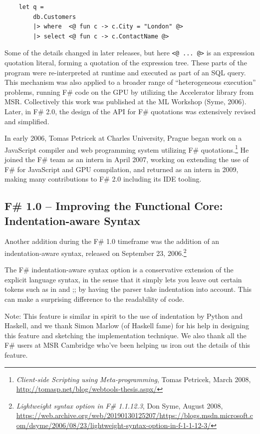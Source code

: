 \documentclass[acmsmall]{acmart}\settopmatter{}
\begin{document}
\begin{verbatim}
    let q =
        db.Customers
        |> where  <@ fun c -> c.City = "London" @> 
        |> select <@ fun c -> c.ContactName @>
\end{verbatim}
Some of the details changed in later releases, but here \verb$<@ ... @>$ is an expression quotation literal, forming a quotation of the expression tree. These parts of the program were re-interpreted at runtime and executed as part of an SQL query.  This mechanism was also applied to a broader range of “heterogeneous execution” problems, running F\# code on the GPU by utilizing the Accelerator library from MSR. Collectively this work was published at the ML Workshop (Syme, 2006). Later, in F\# 2.0, the design of the API for F\# quotations was extensively revised and simplified.

In early 2006, Tomas Petricek at Charles University, Prague began work on a JavaScript compiler and web programming
system utilizing F\# quotations.\footnote{\textit{Client-side Scripting using Meta-programming}, Tomas Petricek, March 2008, \url{http://tomasp.net/blog/webtools-thesis.aspx/}}  He
joined the F\# team as an intern in April 2007, working on extending the use of F\# for JavaScript and GPU compilation,
and returned as an intern in 2009, making many contributions to F\# 2.0 including its IDE tooling.

\subsection*{F\# 1.0 – Improving the Functional Core: Indentation-aware Syntax}

Another addition during the F\# 1.0 timeframe was the addition of an indentation-aware syntax, released on
September 23, 2006.\footnote{\textit{Lightweight syntax option in F\# 1.1.12.3}, Don Syme, August 2008, \url{https://web.archive.org/web/20190130125207/https://blogs.msdn.microsoft.com/dsyme/2006/08/23/lightweight-syntax-option-in-f-1-1-12-3/}}

\begin{verbquote}
The F# indentation-aware syntax option is a conservative extension of the explicit language syntax, in the sense that it simply lets you leave out certain tokens such as in and ;; by having the parser take indentation into account. This can make a surprising difference to the readability of code. 

Note: This feature is similar in spirit to the use of indentation by Python and Haskell, and we thank Simon Marlow (of Haskell fame) for his help in designing this feature and sketching the implementation technique. We also thank all the F# users at MSR Cambridge who've been helping us iron out the details of this feature. 
\end{verbquote}
\end{document}
